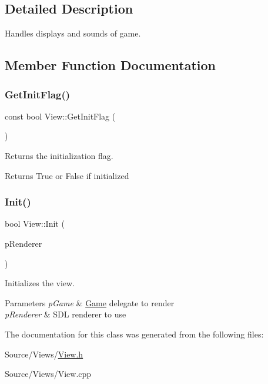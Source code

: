 \subsection{Detailed Description}
Handles display\textquotesingle{}s and sounds of game. 

\subsection{Member Function Documentation}
\mbox{\label{class_view_a899a25e7a81c52ab1ce48ce7675f06df}} 
\subsubsection{\texorpdfstring{Get\+Init\+Flag()}{GetInitFlag()}}
{\footnotesize\ttfamily const bool View\+::\+Get\+Init\+Flag (\begin{DoxyParamCaption}{ }\end{DoxyParamCaption})\hspace{0.3cm}{\ttfamily [inline]}}



Returns the initialization flag. 

\begin{DoxyReturn}{Returns}
True or False if initialized 
\end{DoxyReturn}
\mbox{\label{class_view_a721fe641411d670c3679ee6e188c0084}} 
\subsubsection{\texorpdfstring{Init()}{Init()}}
{\footnotesize\ttfamily bool View\+::\+Init (\begin{DoxyParamCaption}\item[{S\+D\+L\+\_\+\+Renderer $\ast$}]{p\+Renderer }\end{DoxyParamCaption})}



Initializes the view. 


\begin{DoxyParams}{Parameters}
{\em p\+Game} & \mbox{\hyperlink{class_game}{Game}} delegate to render \\
\hline
{\em p\+Renderer} & S\+DL renderer to use \\
\hline
\end{DoxyParams}


The documentation for this class was generated from the following files\+:\begin{DoxyCompactItemize}
\item 
Source/\+Views/\mbox{\hyperlink{_view_8h}{View.\+h}}\item 
Source/\+Views/View.\+cpp\end{DoxyCompactItemize}

